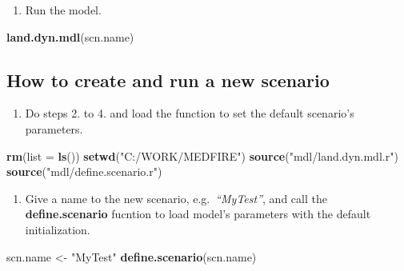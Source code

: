 \documentclass[
]{article}
\newenvironment{Shaded}{\begin{snugshade}}{\end{snugshade}}
\newcommand{\DataTypeTok}[1]{\textcolor[rgb]{0.13,0.29,0.53}{#1}}
\newcommand{\KeywordTok}[1]{\textcolor[rgb]{0.13,0.29,0.53}{\textbf{#1}}}
\newcommand{\NormalTok}[1]{#1}
\newcommand{\StringTok}[1]{\textcolor[rgb]{0.31,0.60,0.02}{#1}}
\providecommand{\tightlist}{%
  \setlength{\itemsep}{0pt}\setlength{\parskip}{0pt}}
\begin{document}
\begin{enumerate}
\def\labelenumi{\arabic{enumi}.}
\setcounter{enumi}{4}
\tightlist
\item
  Run the model.
\end{enumerate}

\begin{Shaded}
\begin{Highlighting}[]
\KeywordTok{land.dyn.mdl}\NormalTok{(scn.name)}
\end{Highlighting}
\end{Shaded}

\hypertarget{how-to-create-and-run-a-new-scenario}{%
\subsection{How to create and run a new
scenario}\label{how-to-create-and-run-a-new-scenario}}

\begin{enumerate}
\def\labelenumi{\arabic{enumi}.}
\tightlist
\item
  Do steps 2. to 4. and load the function to set the default scenario's
  parameters.
\end{enumerate}

\begin{Shaded}
\begin{Highlighting}[]
\KeywordTok{rm}\NormalTok{(}\DataTypeTok{list =} \KeywordTok{ls}\NormalTok{())}
\KeywordTok{setwd}\NormalTok{(}\StringTok{"C:/WORK/MEDFIRE"}\NormalTok{)}
\KeywordTok{source}\NormalTok{(}\StringTok{"mdl/land.dyn.mdl.r"}\NormalTok{)}
\KeywordTok{source}\NormalTok{(}\StringTok{"mdl/define.scenario.r"}\NormalTok{) }
\end{Highlighting}
\end{Shaded}

\begin{enumerate}
\def\labelenumi{\arabic{enumi}.}
\setcounter{enumi}{1}
\tightlist
\item
  Give a name to the new scenario, e.g.~\emph{``MyTest''}, and call the
  \textbf{define.scenario} fucntion to load model's parameters with the
  default initialization.
\end{enumerate}

\begin{Shaded}
\begin{Highlighting}[]
\NormalTok{scn.name <-}\StringTok{ "MyTest"}
\KeywordTok{define.scenario}\NormalTok{(scn.name)}
\end{Highlighting}
\end{Shaded}
\end{document}
